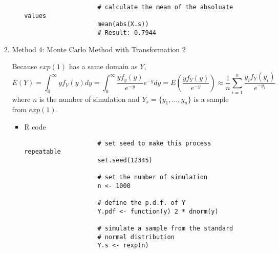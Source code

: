 \begin{enumerate}
\begin{enumerate}
\begin{enumerate}
\begin{itemize}
\begin{verbatim}
					# calculate the mean of the absoluate values
					mean(abs(X.s))
					# Result: 0.7944
					\end{verbatim}
				\end{itemize}
				\item Method 4: Monte Carlo Method with Transformation 2
				\par Because $exp(1)$ has a same domain as $Y$, 
				\begin{equation*}
				E(Y) = \int_{0}^{\infty}yf_Y(y)dy = \int_{0}^{\infty}\frac{yf_y(y)}{e^{-y}}e^{-y}dy = E(\frac{yf_Y(y)}{e^{-y}}) \approx \frac{1}{n}\sum_{i=1}^{n}\frac{y_if_Y(y_i)}{e^{-y_i}}
				\end{equation*}
				where $n$ is the number of simulation and $Y_s = \{y_1, ..., y_n\}$ is a sample from $exp(1)$.
				\begin{itemize}
					\item R code
					\begin{verbatim}
					# set seed to make this process repeatable
					set.seed(12345)
					
					# set the number of simulation
					n <- 1000
					
					# define the p.d.f. of Y
					Y.pdf <- function(y) 2 * dnorm(y)
					
					# simulate a sample from the standard 
					# normal distribution
					Y.s <- rexp(n)
					

\end{verbatim}
\end{itemize}
\end{enumerate}
\end{enumerate}
\end{enumerate}

